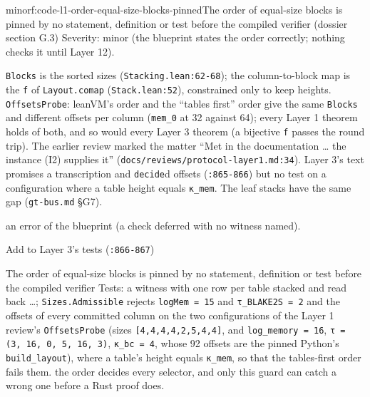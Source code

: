 \begin{finding}{minor}{f:code-l1-order-equal-size-blocks-pinned}{The order of equal-size blocks is pinned by no statement, definition or test before the compiled verifier (dossier section G.3)}
Severity: minor (the blueprint states the order correctly; nothing checks it until Layer 12).

\texttt{Blocks} is the sorted sizes (\texttt{Stacking.\allowbreak{}lean:62-{}68}); the column-to-block map is the \texttt{f} of \texttt{Layout.\allowbreak{}comap} (\texttt{Stack.\allowbreak{}lean:52}), constrained only to keep heights. \texttt{OffsetsProbe}: leanVM's order and the \enquote{tables first} order give the same \texttt{Blocks} and different offsets per column (\texttt{mem\_\allowbreak{}0} at 32 against 64); every Layer 1 theorem holds of both, and so would every Layer 3 theorem (a bijective \texttt{f} passes the round trip). The earlier review marked the matter \enquote{Met in the documentation … the instance (I2) supplies it} (\texttt{d\allowbreak{}o\allowbreak{}c\allowbreak{}s\allowbreak{}/\allowbreak{}r\allowbreak{}e\allowbreak{}v\allowbreak{}i\allowbreak{}e\allowbreak{}w\allowbreak{}s\allowbreak{}/\allowbreak{}p\allowbreak{}r\allowbreak{}o\allowbreak{}t\allowbreak{}o\allowbreak{}c\allowbreak{}o\allowbreak{}l\allowbreak{}-{}\allowbreak{}l\allowbreak{}a\allowbreak{}y\allowbreak{}e\allowbreak{}r\allowbreak{}1\allowbreak{}.\allowbreak{}m\allowbreak{}d\allowbreak{}:\allowbreak{}3\allowbreak{}4}). Layer 3's text promises a transcription and \texttt{decide}d offsets (\texttt{:865-{}866}) but no test on a configuration where a table height equals \texttt{κ\_\allowbreak{}mem}. The leaf stacks have the same gap (\texttt{gt-{}bus.\allowbreak{}md} §G7).

an error of the blueprint (a check deferred with no witness named).

Add to Layer 3's tests (\texttt{:866-{}867})

\begin{change}{The order of equal-size blocks is pinned by no statement, definition or test before the compiled verifier}
\asis Tests: a witness with one row per table stacked and read back …; \texttt{Sizes.\allowbreak{}Admissible} rejects \texttt{logMem = 15} and \texttt{τ\_\allowbreak{}BLAKE2S = 2}
\asproposed and the offsets of every committed column on the two configurations of the Layer 1 review's \texttt{OffsetsProbe} (sizes \texttt{[4,\allowbreak{}4,\allowbreak{}4,\allowbreak{}4,\allowbreak{}2,\allowbreak{}5,\allowbreak{}4,\allowbreak{}4]}, and \texttt{log\_\allowbreak{}memory = 16}, \texttt{τ = (\allowbreak{}3,\allowbreak{} 16,\allowbreak{} 0,\allowbreak{} 5,\allowbreak{} 16,\allowbreak{} 3)}, \texttt{κ\_\allowbreak{}bc = 4}, whose 92 offsets are the pinned Python's \texttt{build\_\allowbreak{}layout}), where a table's height equals \texttt{κ\_\allowbreak{}mem}, so that the tables-first order fails them.
\reason the order decides every selector, and only this guard can catch a wrong one before a Rust proof does.
\end{change}

\end{finding}


